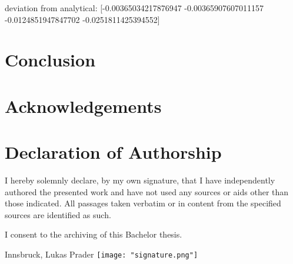 \documentclass[12pt,a4paper]{article}
\begin{document}
deviation from analytical:
[-0.00365034217876947 -0.00365907607011157 -0.0124851947847702
-0.0251811425394552]

\section{Conclusion} \label{sec:conclusion}


\section{Acknowledgements} \label{sec:acknowledgements}


\clearpage
\section*{Declaration of Authorship}

I hereby solemnly declare, by my own signature, that I have independently authored the presented work and have not used any sources or aids other than those indicated. All passages taken verbatim or in content from the specified sources are identified as such.

I consent to the archiving of this Bachelor thesis.

\hfill
\vspace{2cm} Innsbruck, \findate \hfill Lukas Prader \texttt{[image: "signature.png"]}


\newpage
\printbibliography[]

\end{document}
